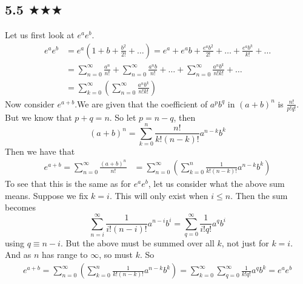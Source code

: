 
\subsection{5.5 $\bigstar \bigstar \bigstar$}
Let us first look at $e^a e^b$.
\begin{align*}
e^a e^b&=e^a(1+b+\frac{b^2}{2!}+\ldots)=e^a+e^a b+\frac{e^a b^2}{2!}+\ldots+\frac{e^a b^k}{k!}+\ldots\\
&=\sum^{\infty}_{n=0}\frac{a^n}{n!}+\sum^{\infty}_{n=0}\frac{a^nb}{n!} +\ldots+\sum^{\infty}_{n=0}\frac{a^n b^k}{n! k!}+\ldots\\
&=\sum_{k=0}^{\infty}\left(\sum^{\infty}_{n=0}\frac{a^n b^k}{n! k!}\right)
\end{align*}
Now consider $e^{a+b}$.We are given that the coefficient of $a^p b^q$ in $(a+b)^n$ is $\frac{n!}{p!q!}$. But we know that $p+q=n$. So let $p=n-q$, then  
\begin{equation}
(a+b)^n=\sum^{n}_{k=0}\frac{n!}{k!(n-k)!}a^{n-k}b^k
\end{equation}
Then we have that
\begin{align*}
e^{a+b}=\sum^{\infty}_{n=0}\frac{(a+b)^n}{n!}&=\sum^{\infty}_{n=0}\left(\sum^{n}_{k=0}\frac{1}{k!(n-k)!}a^{n-k}b^k\right)
\end{align*}
To see that this is the same as for $e^ae^b$, let us consider what the above sum means. Suppose we fix $k=i$. This will only exist when $i\leq n$. Then the sum becomes 
$$\sum^{\infty}_{n=i}\frac{1}{i!(n-i)!}a^{n-i}b^i=\sum^{\infty}_{q=0}\frac{1}{i!q!}a^q b^i$$
using $q\equiv n-i$. But the above must be summed over all $k$, not just for $k=i$. And as $n$ has range to $\infty$, so must $k$. So 
\begin{align*}
e^{a+b}=\sum^{\infty}_{n=0}\left(\sum^{n}_{k=0}\frac{1}{k!(n-k)!}a^{n-k}b^k\right)=\sum^{\infty}_{k=0}\sum_{q=0}^{\infty} \frac{1}{k!q!}a^q b^k=e^ae^b
\end{align*}


